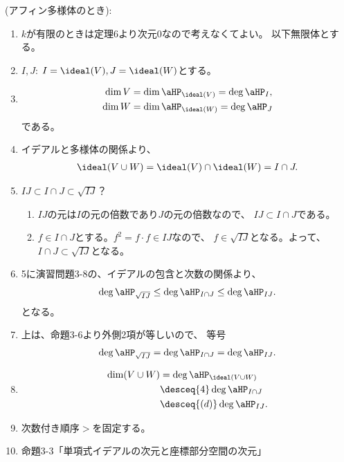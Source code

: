 \begin{myproof}
  (アフィン多様体のとき):
  \begin{enumerate}
    \item $k$が有限のときは定理6より次元0なので考えなくてよい。
    以下無限体とする。
    \item
    $I,J$:
    $I=\ideal(V),J=\ideal(W)$とする。
    \item
    \begin{align}
      \dim V &= \dim \aHP_{\ideal(V)} = \deg \aHP_I,\\
      \dim W &= \dim \aHP_{\ideal(W)} =  \deg \aHP_J
    \end{align}
    である。
    \item
    イデアルと多様体の関係より、
    \begin{align}
      \ideal(V\cup W) = \ideal(V)\cap \ideal(W) = I\cap J.
    \end{align}
    \item
    $IJ \subset I\cap J \subset \sqrt{IJ}$？
    \begin{enumerate}
      \item $IJ$の元は$I$の元の倍数であり$J$の元の倍数なので、
      $IJ \subset I\cap J$である。
      \item
      $f\in I\cap J$とする。$f^2 = f\cdot f \in IJ$なので、
      $f\in \sqrt{IJ}$となる。よって、$I\cap J \subset \sqrt{IJ}$となる。
    \end{enumerate}
  \item
  5に演習問題3-8の、イデアルの包含と次数の関係より、
  \begin{align}
    \deg \aHP_{\sqrt{IJ}}
    \le
    \deg \aHP_{I\cap J}
    \le
    \deg \aHP_{IJ}.
  \end{align}
  となる。
  \item
  上は、命題3-6より外側2項が等しいので、
  等号
  \begin{align}
    \deg \aHP_{\sqrt{IJ}}
    =
    \deg \aHP_{I\cap J}
    =
    \deg \aHP_{IJ}.
  \end{align}
  \item
  \begin{align}
    \dim (V\cup W)
    &=
    \deg \aHP_{\ideal(V\cup W)}\\
    &\desceq{4}
    \deg \aHP_{I\cap J}\\
    &\desceq{(d)}
    \deg \aHP_{IJ}.
  \end{align}
  \item
  次数付き順序$>$を固定する。
  \item
  命題3-3「単項式イデアルの次元と座標部分空間の次元」

\end{enumerate}
\end{myproof}
